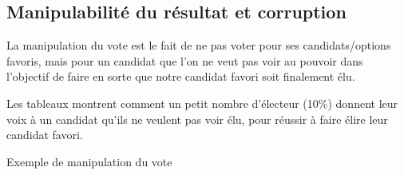 \documentclass[../report]{subfiles}
\begin{document}

  \subsection{Manipulabilité du résultat et corruption}%
  \label{diff:comp:util:manip}%
  \label{diff:comp:util:corruption}

  La manipulation du vote est le fait de ne pas voter pour ses candidats/options favoris, mais 
  pour un candidat que l'on ne veut pas voir au pouvoir dans l'objectif de faire en sorte que 
  notre candidat favori soit finalement élu.
  
  Les tableaux  montrent comment un petit nombre d'électeur 
  (10\%) donnent leur voix à un candidat qu'ils ne veulent pas voir élu, pour réussir à faire 
  élire leur candidat favori.

  \begin{table}[h]
	\begin{center}
		\caption{Exemple de manipulation du vote}%
		\label{fig:critere:manip:example}
		\\[1em]
	\end{center}
  \end{table}
\end{document}
